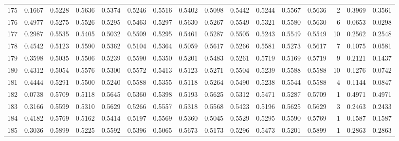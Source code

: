 \begin{tabular}{lrrrrrrrrrrrrrrr}
175 &      0.1667 &  0.5228 &  0.5636 &  0.5374 &  0.5246 &  0.5516 &  0.5402 &  0.5098 &  0.5442 &  0.5244 &   0.5567 &     0.5636 &      2 &                    0.3969 &                     0.3561 \\
176 &      0.4977 &  0.5275 &  0.5526 &  0.5295 &  0.5463 &  0.5297 &  0.5630 &  0.5267 &  0.5549 &  0.5321 &   0.5580 &     0.5630 &      6 &                    0.0653 &                     0.0298 \\
177 &      0.2987 &  0.5535 &  0.5405 &  0.5032 &  0.5509 &  0.5295 &  0.5461 &  0.5287 &  0.5505 &  0.5243 &   0.5549 &     0.5549 &     10 &                    0.2562 &                     0.2548 \\
178 &      0.4542 &  0.5123 &  0.5590 &  0.5362 &  0.5104 &  0.5364 &  0.5059 &  0.5617 &  0.5266 &  0.5581 &   0.5273 &     0.5617 &      7 &                    0.1075 &                     0.0581 \\
179 &      0.3598 &  0.5035 &  0.5506 &  0.5239 &  0.5590 &  0.5350 &  0.5201 &  0.5483 &  0.5261 &  0.5719 &   0.5169 &     0.5719 &      9 &                    0.2121 &                     0.1437 \\
180 &      0.4312 &  0.5054 &  0.5576 &  0.5300 &  0.5572 &  0.5413 &  0.5123 &  0.5271 &  0.5504 &  0.5239 &   0.5588 &     0.5588 &     10 &                    0.1276 &                     0.0742 \\
181 &      0.4444 &  0.5291 &  0.5500 &  0.5240 &  0.5588 &  0.5355 &  0.5118 &  0.5264 &  0.5490 &  0.5238 &   0.5544 &     0.5588 &      4 &                    0.1144 &                     0.0847 \\
182 &      0.0738 &  0.5709 &  0.5118 &  0.5645 &  0.5360 &  0.5398 &  0.5193 &  0.5625 &  0.5312 &  0.5471 &   0.5287 &     0.5709 &      1 &                    0.4971 &                     0.4971 \\
183 &      0.3166 &  0.5599 &  0.5310 &  0.5629 &  0.5266 &  0.5557 &  0.5318 &  0.5568 &  0.5423 &  0.5196 &   0.5625 &     0.5629 &      3 &                    0.2463 &                     0.2433 \\
184 &      0.4182 &  0.5769 &  0.5162 &  0.5414 &  0.5197 &  0.5569 &  0.5360 &  0.5045 &  0.5529 &  0.5295 &   0.5590 &     0.5769 &      1 &                    0.1587 &                     0.1587 \\
185 &      0.3036 &  0.5899 &  0.5225 &  0.5592 &  0.5396 &  0.5065 &  0.5673 &  0.5173 &  0.5296 &  0.5473 &   0.5201 &     0.5899 &      1 &                    0.2863 &                     0.2863 \\

\end{tabular}

